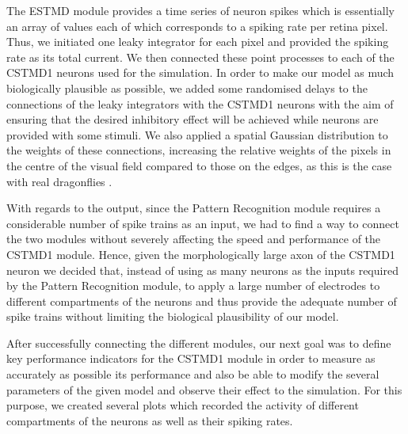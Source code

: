 \documentclass[a4paper,11pt]{article}
\begin{document}
The ESTMD module provides a time series of neuron spikes which is essentially an array of values each of which corresponds to a spiking rate per retina pixel. Thus, we initiated one leaky integrator for each pixel and provided the spiking rate as its total current. We then connected these point processes to each of the CSTMD1 neurons used for the simulation. In order to make our model as much biologically plausible as possible, we added some randomised delays to the connections of the leaky integrators with the CSTMD1 neurons with the aim of ensuring that the desired inhibitory effect will be achieved while neurons are provided with some stimuli. We also applied a spatial Gaussian distribution to the weights of these connections, increasing the relative weights of the pixels in the centre of the visual field compared to those on the edges, as this is the case with real dragonflies \cite{w13}.

With regards to the output, since the Pattern Recognition module requires a considerable number of spike trains as an input, we had to find a way to connect the two modules without severely affecting the speed and performance of the CSTMD1 module. Hence, given the morphologically large axon of the CSTMD1 neuron \cite{geurten} we decided that, instead of using as many neurons as the inputs required by the Pattern Recognition module, to apply a large number of electrodes to different compartments of the neurons and thus provide the adequate number of spike trains without limiting the biological plausibility of our model.

After successfully connecting the different modules, our next goal was to define key performance indicators for the CSTMD1 module in order to measure as accurately as possible its performance and also be able to modify the several parameters of the given model and observe their effect to the simulation. For this purpose, we created several plots which recorded the activity of different compartments of the neurons as well as their spiking rates. 
\end{document}
